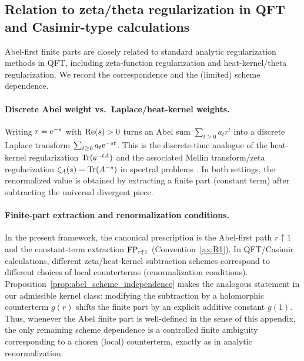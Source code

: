 \subsection{Relation to zeta/theta regularization in QFT and Casimir-type calculations}
\label{sec:abel_vs_qft}

Abel-first finite parts are closely related to standard analytic regularization methods in QFT, including zeta-function regularization and heat-kernel/theta regularization.
We record the correspondence and the (limited) scheme dependence.

\paragraph{Discrete Abel weight vs.\ Laplace/heat-kernel weights.}
Writing $r=\mathrm{e}^{-s}$ with $\operatorname{Re}(s)>0$ turns an Abel sum $\sum_{t\ge 0} a_t r^t$ into a discrete Laplace transform $\sum_{t\ge 0} a_t \mathrm{e}^{-st}$.
This is the discrete-time analogue of the heat-kernel regularization $\mathrm{Tr}(\mathrm{e}^{-tA})$ and the associated Mellin transform/zeta regularization $\zeta_A(s)=\mathrm{Tr}(A^{-s})$ in spectral problems \cite{Hawking1977ZetaRegularization,Elizalde1995,Kirsten2001}.
In both settings, the renormalized value is obtained by extracting a finite part (constant term) after subtracting the universal divergent piece.

\paragraph{Finite-part extraction and renormalization conditions.}
In the present framework, the canonical prescription is the Abel-first path $r\uparrow 1$ and the constant-term extraction $\mathrm{FP}_{r\uparrow 1}$ (Convention~\ref{ax:R1}).
In QFT/Casimir calculations, different zeta/heat-kernel subtraction schemes correspond to different choices of local counterterms (renormalization conditions).
Proposition~\ref{prop:abel_scheme_independence} makes the analogous statement in our admissible kernel class: modifying the subtraction by a holomorphic counterterm $g(r)$ shifts the finite part by an explicit additive constant $g(1)$.
Thus, whenever the Abel finite part is well-defined in the sense of this appendix, the only remaining scheme dependence is a controlled finite ambiguity corresponding to a chosen (local) counterterm, exactly as in analytic renormalization.

